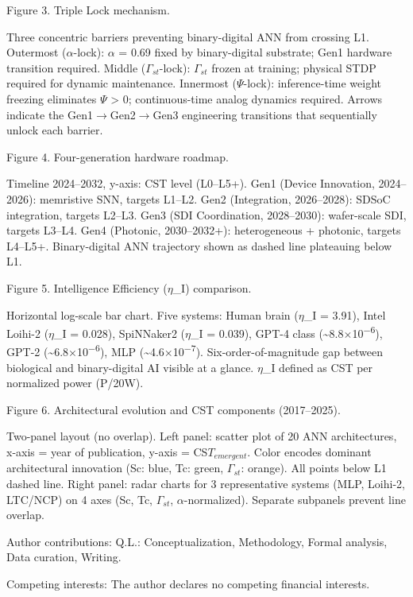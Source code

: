 \documentclass[a4paper,12pt]{article}
\begin{document}
Figure 3. Triple Lock mechanism.

Three concentric barriers preventing binary-digital ANN from crossing L1.
Outermost ($\alpha$-lock): $\alpha$ = 0.69 fixed by binary-digital substrate; Gen1 hardware transition required.
Middle ($\Gamma_{st}$-lock): $\Gamma_{st}$ frozen at training; physical STDP required for dynamic maintenance.
Innermost ($\Psi$-lock): inference-time weight freezing eliminates $\Psi$ > 0; continuous-time analog dynamics required.
Arrows indicate the Gen1$\rightarrow$Gen2$\rightarrow$Gen3 engineering transitions that sequentially unlock each barrier.

Figure 4. Four-generation hardware roadmap.

Timeline 2024--2032, y-axis: CST level (L0--L5+). Gen1 (Device Innovation, 2024--2026): memristive SNN, targets L1--L2. Gen2 (Integration, 2026--2028): SDSoC integration, targets L2--L3. Gen3 (SDI Coordination, 2028--2030): wafer-scale SDI, targets L3--L4. Gen4 (Photonic, 2030--2032+): heterogeneous + photonic, targets L4--L5+. Binary-digital ANN trajectory shown as dashed line plateauing below L1.

Figure 5. Intelligence Efficiency ($\eta$\_I) comparison.

Horizontal log-scale bar chart. Five systems: Human brain ($\eta$\_I = 3.91), Intel Loihi-2 ($\eta$\_I = 0.028), SpiNNaker2 ($\eta$\_I = 0.039), GPT-4 class (\textasciitilde{}8.8$\times$10\textsuperscript{$-$}\textsuperscript{6}), GPT-2 (\textasciitilde{}6.8$\times$10\textsuperscript{$-$}\textsuperscript{6}), MLP (\textasciitilde{}4.6$\times$10\textsuperscript{$-$}\textsuperscript{7}). Six-order-of-magnitude gap between biological and binary-digital AI visible at a glance. $\eta$\_I defined as CST per normalized power (P/20W).

Figure 6. Architectural evolution and CST components (2017--2025).

Two-panel layout (no overlap). Left panel: scatter plot of 20 ANN architectures, x-axis = year of publication, y-axis = CS$T_{emergent}$. Color encodes dominant architectural innovation (Sc: blue, Tc: green, $\Gamma_{st}$: orange). All points below L1 dashed line. Right panel: radar charts for 3 representative systems (MLP, Loihi-2, LTC/NCP) on 4 axes (Sc, Tc, $\Gamma_{st}$, $\alpha$-normalized). Separate subpanels prevent line overlap.

Author contributions: Q.L.: Conceptualization, Methodology, Formal analysis, Data curation, Writing.

Competing interests: The author declares no competing financial interests.
\end{document}
